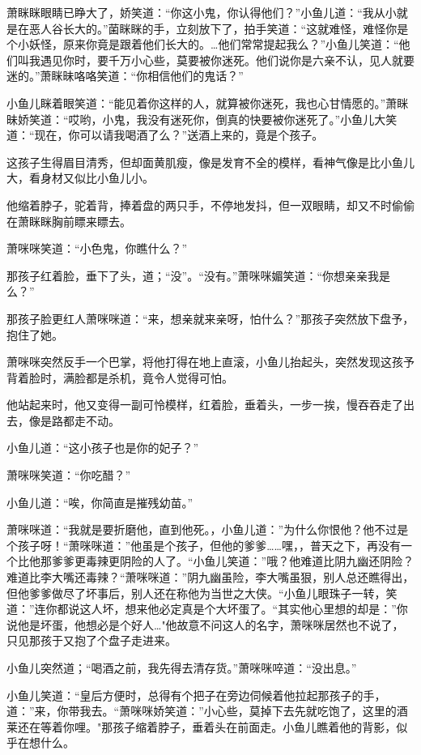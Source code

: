 \documentclass[12pt,oneside]{book}
\begin{document}
萧眯眯眼睛已睁大了，娇笑道：``你这小鬼，你认得他们？''小鱼儿道：``我从小就是在恶人谷长大的。''菌眯眯的手，立刻放下了，拍手笑道：``这就难怪，难怪你是个小妖怪，原来你竟是跟着他们长大的。\ldots 他们常常提起我么？''小鱼儿笑道：``他们叫我遇见你时，要千万小心些，莫要被你迷死。他们说你是六亲不认，见人就要迷的。''萧眯昧咯咯笑道：``你相信他们的鬼话？''

小鱼儿眯着眼笑道：``能见着你这样的人，就算被你迷死，我也心甘情愿的。''萧眯昧娇笑道：``哎哟，小鬼，我没有迷死你，倒真的快要被你迷死了。''小鱼儿大笑道：``现在，你可以请我喝酒了么？''送酒上来的，竟是个孩子。

这孩子生得眉目清秀，但却面黄肌瘦，像是发育不全的模样，看神气像是比小鱼儿大，看身材又似比小鱼儿小。

他缩着脖子，驼着背，捧着盘的两只手，不停地发抖，但一双眼睛，却又不时偷偷在萧眯眯胸前瞟来瞟去。

萧咪咪笑道：``小色鬼，你瞧什么？''

那孩子红着脸，垂下了头，道；``没''。``没有。''萧咪咪媚笑道：``你想亲亲我是么？''

那孩子脸更红人萧咪咪道：``来，想亲就来亲呀，怕什么？''那孩子突然放下盘予，抱住了她。

萧咪咪突然反手一个巴掌，将他打得在地上直滚，小鱼儿抬起头，突然发现这孩予背着脸时，满脸都是杀机，竟令人觉得可怕。

他站起来时，他又变得一副可怜模样，红着脸，垂着头，一步一挨，慢吞吞走了出去，像是路都走不动。

小鱼儿道：``这小孩子也是你的妃子？''

萧咪咪笑道：``你吃醋？''

小鱼儿道：``唉，你简直是摧残幼苗。''

萧咪咪道：``我就是要折磨他，直到他死。，小鱼儿道：''为什么你恨他？他不过是个孩子呀！``萧咪咪道：''他虽是个孩子，但他的爹爹\ldots\ldots 嘿，，普天之下，再没有一个比他那爹爹更毒辣更阴险的人了。``小鱼儿笑道：''哦？他难道比阴九幽还阴险？难道比李大嘴还毒辣？``萧咪咪道：''阴九幽虽险，李大嘴虽狠，别人总还瞧得出，但他爹爹做尽了坏事后，别人还在称他为当世之大侠。``小鱼儿眼珠子一转，笑道：''连你都说这人坏，想来他必定真是个大坏蛋了。``其实他心里想的却是：''你说他是坏蛋，他想必是个好人\ldots"他故意不问这人的名字，萧咪咪居然也不说了，只见那孩于又抱了个盘子走进来。

小鱼儿突然道；``喝酒之前，我先得去清存货。''萧咪咪啐道：``没出息。''

小鱼儿笑道：``皇后方便时，总得有个把子在旁边伺候着他拉起那孩子的手，道：''来，你带我去。``萧咪咪娇笑道：''小心些，莫掉下去先就吃饱了，这里的酒莱还在等着你哩。"那孩子缩着脖子，垂着头在前面走。小鱼儿瞧着他的背影，似乎在想什么。
\end{document}
